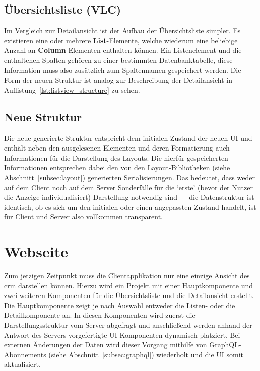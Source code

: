 \subsection{Übersichtsliste (VLC)}
Im Vergleich zur Detailansicht ist der Aufbau der Übersichtsliste simpler. Es existieren eine oder mehrere \textbf{List}-Elemente, welche wiederum eine beliebige Anzahl an \textbf{Column}-Elementen enthalten können. Ein Listenelement und die enthaltenen Spalten gehören zu einer bestimmten Datenbanktabelle, diese Information muss also zusätzlich zum Spaltennamen gespeichert werden. Die Form der neuen Struktur ist analog zur Beschreibung der Detailansicht in Auflistung~\ref{lst:listview_structure} zu sehen.



\subsection{Neue Struktur}
Die neue generierte Struktur entspricht dem initialen Zustand der neuen UI und enthält neben den ausgelesenen Elementen und deren Formatierung auch Informationen für die Darstellung des Layouts. Die hierfür gespeicherten Informationen entsprechen dabei den von den Layout-Bibliotheken (siehe Abschnitt~\ref{subsec:layout}) generierten Serialisierungen. Das bedeutet, dass weder auf dem Client noch auf dem Server Sonderfälle für die `erste' (bevor der Nutzer die Anzeige individualisiert) Darstellung notwendig sind --- die Datenstruktur ist identisch, ob es sich um den initialen oder einen angepassten Zustand handelt, ist für Client und Server also vollkommen transparent.

\section{Webseite}
Zum jetzigen Zeitpunkt muss die Clientapplikation nur eine einzige Ansicht des \gls{crm} darstellen können. Hierzu wird ein Projekt mit einer Hauptkomponente und zwei weiteren Komponenten für die Übersichtsliste und die Detailansicht erstellt. Die Hauptkomponente zeigt je nach Auswahl entweder die Listen- oder die Detailkomponente an. In diesen Komponenten wird zuerst die Darstellungsstruktur vom Server abgefragt und anschließend werden anhand der Antwort des Servers vorgefertigte UI-Komponenten dynamisch platziert. Bei externen Änderungen der Daten wird dieser Vorgang mithilfe von GraphQL-Abonnements (siehe Abschnitt~\ref{subsec:graphql}) wiederholt und die UI somit aktualisiert.

